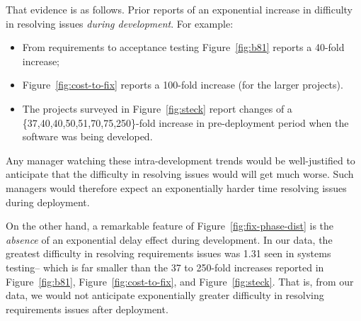 \documentclass{sig-alternate}
\newcommand{\bi}{\begin{itemize}}%
\newcommand{\ei}{\end{itemize}}
\newcommand{\fig}[1]{Figure~\ref{fig:#1}}
\begin{document}
That evidence is as follows.
Prior reports of an  exponential increase in difficulty in resolving issues {\em during
development}.
For example:
\bi
\item  From requirements to acceptance testing
\fig{b81} reports a 40-fold increase;
\item
 \fig{cost-to-fix} reports a 100-fold increase
(for the larger projects).
\item
The projects surveyed in \fig{steck} report changes of a  \newline
\{37,40,40,50,51,70,75,250\}-fold increase in pre-deployment period when the software was being developed.
\ei
Any manager watching  these intra-development trends would be well-justified
to anticipate that  the difficulty in resolving issues would will get much worse. Such managers
would therefore expect an exponentially harder time resolving issues during deployment.

On the other hand, a remarkable feature of Figure~\ref{fig:fix-phase-dist} is the {\em absence}
of an exponential delay effect during development.
In our data, the greatest difficulty in resolving requirements issues was 1.31 seen in systems testing--
which is far smaller than the 37 to 250-fold increases reported in \fig{b81}, \fig{cost-to-fix},
and \fig{steck}.  That is, from our  data, we would not anticipate exponentially greater difficulty in resolving requirements issues after
deployment. 
\end{document}
